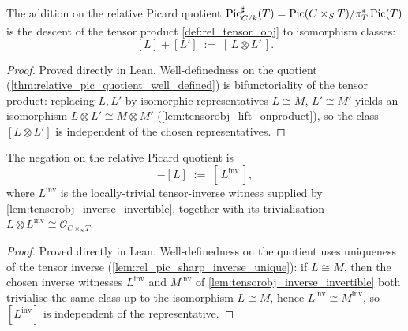 \begin{definition}\leanok
  \label{def:rel_add}
  The addition on the relative Picard quotient
  \(\operatorname{Pic}^\sharp_{C/k}(T) = \operatorname{Pic}(C \times_S T)/\pi_T^*\operatorname{Pic}(T)\) is the descent of
  the tensor product \cref{def:rel_tensor_obj} to isomorphism classes:
  \[
    [L] + [L'] \;:=\; [\,L \otimes L'\,].
  \]
\end{definition}

\begin{proof}
  \leanok
  Proved directly in Lean. Well-definedness on the quotient
  (\cref{thm:relative_pic_quotient_well_defined}) is bifunctoriality of the
  tensor product: replacing \(L, L'\) by isomorphic representatives
  \(L \cong M\), \(L' \cong M'\) yields an isomorphism
  \(L \otimes L' \cong M \otimes M'\) (\cref{lem:tensorobj_lift_onproduct}),
  so the class \([L \otimes L']\) is independent of the chosen representatives.
\end{proof}

\begin{definition}\leanok
  \label{def:rel_neg}
  The negation on the relative Picard quotient is
  \[
    -[L] \;:=\; [\,L^{\mathrm{inv}}\,],
  \]
  where \(L^{\mathrm{inv}}\) is the locally-trivial tensor-inverse witness
  supplied by \cref{lem:tensorobj_inverse_invertible}, together with its
  trivialisation \(L \otimes L^{\mathrm{inv}} \cong \mathcal{O}_{C \times_S T}\).
\end{definition}

\begin{proof}
  \leanok
  Proved directly in Lean. Well-definedness on the quotient uses uniqueness of
  the tensor inverse (\cref{lem:rel_pic_sharp_inverse_unique}): if
  \(L \cong M\), then the chosen inverse witnesses \(L^{\mathrm{inv}}\) and
  \(M^{\mathrm{inv}}\) of \cref{lem:tensorobj_inverse_invertible} both trivialise
  the same class up to the isomorphism \(L \cong M\), hence
  \(L^{\mathrm{inv}} \cong M^{\mathrm{inv}}\), so \([L^{\mathrm{inv}}]\) is
  independent of the representative.
\end{proof}

